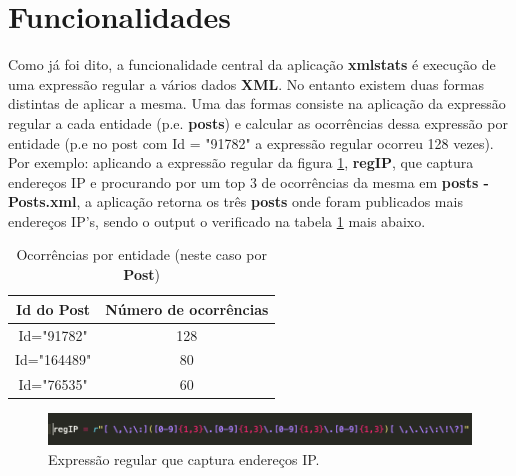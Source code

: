 \documentclass[11pt,a4paper]{report}%
\begin{document}
\section{Funcionalidades}
Como já foi dito, a funcionalidade central da aplicação \textbf{xmlstats} é execução de uma expressão regular a vários dados \textbf{XML}. No entanto existem duas formas distintas de aplicar a mesma. \newline \newline Uma das formas consiste na aplicação da expressão regular a cada entidade (p.e. \textbf{posts}) e calcular as ocorrências dessa expressão por entidade (p.e no post com Id = "91782" a expressão regular ocorreu 128 vezes). \newline Por exemplo: aplicando a expressão regular da figura \ref{img:regIp}, \textbf{regIP}, que captura endereços IP e procurando por um top 3 de ocorrências da mesma em \textbf{posts - Posts.xml}, a aplicação retorna os três \textbf{posts} onde foram publicados mais endereços IP's, sendo o output o verificado na tabela \ref{tab:outputPorEntidade} mais abaixo.

\begin{table}[h!] %
\begin{center} %
\begin{tabular}{ | c | c | } %
  \hline  %
  Id do Post &  Número de ocorrências \\
  \hline
  Id="91782"  & 128 \\
  Id="164489" & 80 \\
  Id="76535" & 60 \\
  \hline
\end{tabular}
\end{center}
\caption{Ocorrências por entidade (neste caso por \textbf{Post})} \label{tab:outputPorEntidade}
\end{table}

\begin{figure}[]
	\centering
	\includegraphics[scale=0.5]{regexIp.png}
	\caption{Expressão regular que captura endereços IP.}
	\label{img:regIp}
\end{figure}
\end{document}
